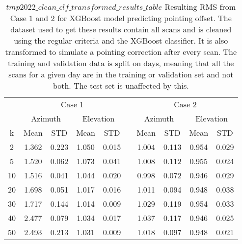 \begin{table}[!htbp]
    \centering
    \caption{$tmp2022\_clean\_clf\_transformed\_results\_table$
    Resulting RMS from Case $1$ and $2$ for XGBoost model predicting pointing offset.
    The dataset used to get these results contain all scans and is cleaned using the regular criteria and the XGBoost classifier.
    It is also transformed to simulate a pointing correction after every scan.
    The training and validation data is split on days, meaning that all the scans for a given day
    are in the training or validation set and not both. The test set is unaffected by this.}
    \begin{tabular}{ccccc c cccc}
        \toprule
        \multicolumn{1}{c}{} & \multicolumn{4}{c}{Case 1} & & \multicolumn{4}{c}{Case 2} \\
        \cmidrule(lr){2-5} \cmidrule(lr){7-10}
        \multicolumn{1}{c}{} & \multicolumn{2}{c}{Azimuth} & \multicolumn{2}{c}{Elevation} & & \multicolumn{2}{c}{Azimuth} & \multicolumn{2}{c}{Elevation} \\ 
        \cmidrule(lr){2-5} \cmidrule(lr){7-10}
        k & Mean & STD & Mean & STD & & Mean & STD & Mean & STD \\ 
        \midrule
         2 &     1.362 &     0.223 &     1.050 &     0.015 &  &  1.004 &     0.113 &     0.954 &     0.029 \\
         5 &     1.520 &     0.062 &     1.073 &     0.041 &  &  1.008 &     0.112 &     0.955 &     0.024 \\
        10 &     1.516 &     0.041 &     1.044 &     0.020 &  &  0.998 &     0.072 &     0.946 &     0.029 \\
        20 &     1.698 &     0.051 &     1.017 &     0.016 &  &  1.011 &     0.094 &     0.948 &     0.038 \\
        30 &     1.717 &     0.144 &     1.014 &     0.009 &  &  1.029 &     0.119 &     0.954 &     0.033 \\
        40 &     2.477 &     0.079 &     1.034 &     0.017 &  &  1.037 &     0.117 &     0.946 &     0.025 \\
        50 &     2.493 &     0.213 &     1.031 &     0.009 &  &  1.018 &     0.097 &     0.948 &     0.021 \\
        \bottomrule
    \end{tabular}        
\end{table}



